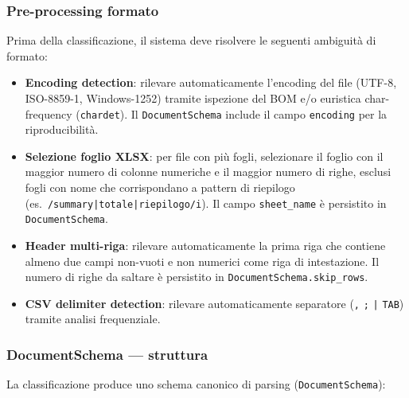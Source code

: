 \documentclass[11pt, a4paper]{article}
\begin{document}
\subsubsection{Pre-processing formato}

Prima della classificazione, il sistema deve risolvere le seguenti ambiguità di formato:

\begin{itemize}[leftmargin=2em]
  \item \textbf{Encoding detection}: rilevare automaticamente l'encoding del file
        (UTF-8, ISO-8859-1, Windows-1252) tramite ispezione del BOM e/o euristica
        char-frequency (\texttt{chardet}). Il \texttt{DocumentSchema} include il
        campo \texttt{encoding} per la riproducibilità.
  \item \textbf{Selezione foglio XLSX}: per file con più fogli, selezionare il foglio
        con il maggior numero di colonne numeriche e il maggior numero di righe,
        esclusi fogli con nome che corrispondano a pattern di riepilogo
        (es.\ \texttt{/summary|totale|riepilogo/i}). Il campo \texttt{sheet\_name} è
        persistito in \texttt{DocumentSchema}.
  \item \textbf{Header multi-riga}: rilevare automaticamente la prima riga che contiene
        almeno due campi non-vuoti e non numerici come riga di intestazione.
        Il numero di righe da saltare è persistito in \texttt{DocumentSchema.skip\_rows}.
  \item \textbf{CSV delimiter detection}: rilevare automaticamente separatore
        (\texttt{,} \texttt{;} \texttt{|} \texttt{TAB}) tramite analisi frequenziale.
\end{itemize}

\subsubsection{DocumentSchema --- struttura}

La classificazione produce uno schema canonico di parsing (\texttt{DocumentSchema}):
\end{document}
